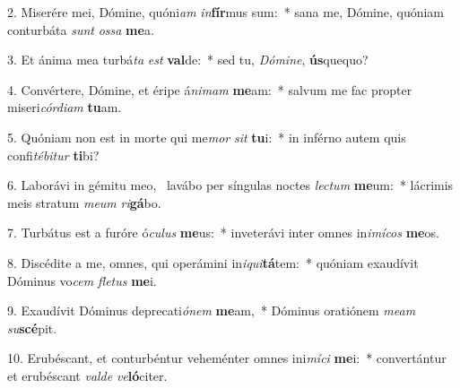 2. Miserére mei, Dómine, quóni\textit{am} \textit{in}\textbf{fír}mus sum:~*  sana me, Dómine, quóniam conturbáta \textit{sunt} \textit{os}\textit{sa} \textbf{me}a.\

3. Et ánima mea turbá\textit{ta} \textit{est} \textbf{val}de:~*  sed tu, \textit{Dó}\textit{mi}\textit{ne}, \textbf{ús}quequo?\

4. Convértere, Dómine, et éripe á\textit{ni}\textit{mam} \textbf{me}am:~*  salvum me fac propter miseri\textit{cór}\textit{di}\textit{am} \textbf{tu}am.\

5. Quóniam non est in morte qui me\textit{mor} \textit{sit} \textbf{tu}i:~*  in inférno autem quis confi\textit{té}\textit{bi}\textit{tur} \textbf{ti}bi?\

6. Laborávi in gémitu meo, \dag\  lavábo per síngulas noctes \textit{lec}\textit{tum} \textbf{me}um:~*  lácrimis meis stratum \textit{me}\textit{um} \textit{ri}\textbf{gá}bo.\

7. Turbátus est a furóre ó\textit{cu}\textit{lus} \textbf{me}us:~*  inveterávi inter omnes in\textit{i}\textit{mí}\textit{cos} \textbf{me}os.\

8. Discédite a me, omnes, qui operámini in\textit{i}\textit{qui}\textbf{tá}tem:~*  quóniam exaudívit Dóminus vo\textit{cem} \textit{fle}\textit{tus} \textbf{me}i.\

9. Exaudívit Dóminus deprecati\textit{ó}\textit{nem} \textbf{me}am,~*  Dóminus oratiónem \textit{me}\textit{am} \textit{su}\textbf{scé}pit.\

10. Erubéscant, et conturbéntur veheménter omnes ini\textit{mí}\textit{ci} \textbf{me}i:~*  convertántur et erubéscant \textit{val}\textit{de} \textit{ve}\textbf{ló}citer.\

